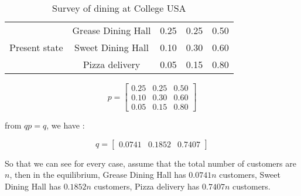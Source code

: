 \documentclass[12pt,a4paper]{article}
\begin{document}
\begin{spacing}{1.5}
\begin{table}[htb]
\begin{tabular}{ccccc}
	\\ \cline{2-5} \multicolumn{1}{c|}{}              
    &  \multicolumn{1}{c|}{Grease Dining Hall} 
    &  0.25 
    &  0.25              
    &  \multicolumn{1}{c|}{0.50}
    
    \\ \multicolumn{1}{c|}{Present state} 
    &  \multicolumn{1}{c|}{Sweet Dining Hall}  
    &  0.10
    &  0.30         
    &  \multicolumn{1}{c|}{0.60}                                           
    
    \\ \multicolumn{1}{c|}{}              
    &  \multicolumn{1}{c|}{Pizza delivery}    
    &  0.05                                 
    &  0.15                                   
    &  \multicolumn{1}{c|}{0.80}
    
    \\ \cline{2-5}  
   	\end{tabular}
\caption{Survey of dining at College USA}\label{T:hw-6-1}
\end{table}

\begin{center}
\[ {p}= 
\begin{bmatrix} 
0.25 & 0.25 & 0.50
\\[8pt] 
0.10 & 0.30 & 0.60
\\[8pt] 
0.05 & 0.15 & 0.80
\end{bmatrix} \] 
\end{center}
from $qp = q$, we have :
\begin{center}
\[ {q}= 
\begin{bmatrix} 
0.0741 & 0.1852 & 0.7407 
\end{bmatrix} \] 
\end{center}
So that we can see for every case, assume that the total number of customers are $n$, then in the equilibrium, Grease Dining Hall has $0.0741n$ customers, Sweet Dining Hall has $0.1852n$ customers, Pizza delivery has $0.7407n$ customers.

\end{spacing}
\end{document}
